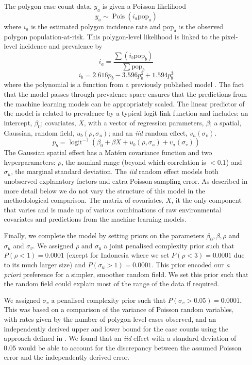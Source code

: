 \documentclass[review]{elsarticle}
\begin{document}
The polygon case count data, $y_a$ is given a Poisson likelihood
$$y_a \sim \operatorname{Pois}(i_a\mathrm{pop_a})$$
where $i_a$ is the estimated polygon incidence rate and $\mathrm{pop_a}$ is the observed polygon population-at-risk. 
This polygon-level likelihood is linked to the pixel-level incidence and prevalence by
$$i_a = \frac{ \sum(i_b \mathrm{pop}_b)}{\sum  \mathrm{pop}_b} $$
$$i_b = 2.616p_b - 3.596p_b^2 + 1.594p_b^3$$
where the polynomial is  a function from a previously published model \citep{cameron2015defining}.
The fact that the model passes through prevalence space ensures that the predictions from the machine learning models can be appropriately scaled.
The linear predictor of the model is related to prevalence by a typical logit link function and includes: an intercept, $\beta_0$; covariates, $X$, with a vector of regression parameters, $\beta$; a spatial, Gaussian, random field, $u_b(\rho, \sigma_u)$; and an \emph{iid} random effect, $v_a(\sigma_v)$.
$$p_b = \operatorname{logit}^{-1}\left(\beta_0 + \beta X  + u_b\left(\rho, \sigma_u\right) + v_a\left(\sigma_v\right)\right)$$
The Gaussian spatial effect has a Mat\'ern covariance function and two hyperparameters: $\rho$, the nominal range (beyond which correlation is $< 0.1$) and $\sigma_u$, the marginal standard deviation.
The \emph{iid} random effect models both unobserved explanatory factors and extra-Poisson sampling error.
As described in more detail below we do not vary the structure of this model in the methodological comparison.
The matrix of covariates, $X$, it the only component that varies and is made up of various combinations of raw environmental covariates and predictions from the machine learning models.

Finally, we complete the model by setting priors on the parameters $\beta_0, \beta, \rho$ and $\sigma_u$ and $\sigma_v$. 
We assigned $\rho$ and $\sigma_u$ a joint penalised complexity prior \citep{fuglstad2018constructing} such that $P(\rho < 1) = 0.0001$ (except for Indonesia where we set $P(\rho < 3) = 0.0001$ due to its much larger size) and $P(\sigma_u > 1) = 0.0001$. 
This prior encoded our \emph{a priori} preference for a simpler, smoother random field.
We set this prior such that the random field could explain most of the range of the data if required.

We assigned $\sigma_v$ a penalised complexity prior \citep{simpson2017penalising} such that $P(\sigma_v > 0.05) =  0.0001$. 
This was based on a comparison of the variance of Poisson random variables, with rates given by the number of polygon-level cases observed, and an independently derived upper and lower bound for the case counts using the approach defined in \citep{cibulskis2011worldwide}. 
We found that an \emph{iid} effect with a standard deviation of 0.05 would be able to account for the discrepancy between the assumed Poisson error and the independently derived error.
\end{document}
